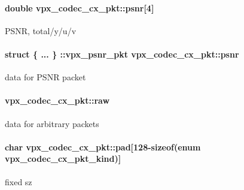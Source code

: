 \paragraph[{\texorpdfstring{psnr}{psnr}}]{\setlength{\rightskip}{0pt plus 5cm}double vpx\+\_\+codec\+\_\+cx\+\_\+pkt\+::psnr\mbox{[}4\mbox{]}}\hypertarget{structvpx__codec__cx__pkt_a63744aeceb50355d6402d55309c151b6}{}\label{structvpx__codec__cx__pkt_a63744aeceb50355d6402d55309c151b6}
P\+S\+NR, total/y/u/v 
\paragraph[{\texorpdfstring{psnr}{psnr}}]{\setlength{\rightskip}{0pt plus 5cm}struct \{ ... \} \+::vpx\+\_\+psnr\+\_\+pkt  vpx\+\_\+codec\+\_\+cx\+\_\+pkt\+::psnr}\hypertarget{structvpx__codec__cx__pkt_ac91dc0ee23d3d939b85eb82eb5ccc042}{}\label{structvpx__codec__cx__pkt_ac91dc0ee23d3d939b85eb82eb5ccc042}
data for P\+S\+NR packet 
\paragraph[{\texorpdfstring{raw}{raw}}]{ vpx\+\_\+codec\+\_\+cx\+\_\+pkt\+::raw}\hypertarget{structvpx__codec__cx__pkt_aaa868193733b055ea9fec923c64fbd19}{}\label{structvpx__codec__cx__pkt_aaa868193733b055ea9fec923c64fbd19}
data for arbitrary packets 
\paragraph[{\texorpdfstring{pad}{pad}}]{\setlength{\rightskip}{0pt plus 5cm}char vpx\+\_\+codec\+\_\+cx\+\_\+pkt\+::pad\mbox{[}128-\/sizeof(enum {\bf vpx\+\_\+codec\+\_\+cx\+\_\+pkt\+\_\+kind})\mbox{]}}\hypertarget{structvpx__codec__cx__pkt_a49a0ba012fdabd49bff8069dfacf6ced}{}\label{structvpx__codec__cx__pkt_a49a0ba012fdabd49bff8069dfacf6ced}
fixed sz 
